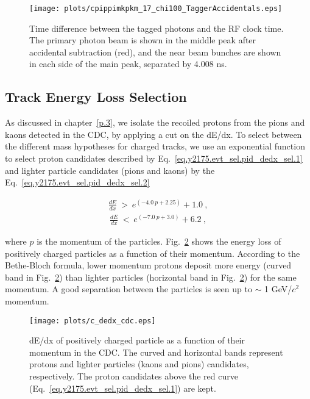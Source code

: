 \begin{figure}[H]
    \centering
        \texttt{[image: plots/cpippimkpkm\_17\_chi100\_TaggerAccidentals.eps]}
        \caption{Time difference between the tagged photons and the RF clock time. The primary photon beam is shown in the middle peak after accidental subtraction (red), and the near beam bunches are shown in each side of the main peak, separated by 4.008 ns.}
        \label{fig.chap.y2175.evt_sel.bea_pho_acc_sub}
\end{figure}

\subsection{Track Energy Loss Selection}
\label{chap.y2175.evt_sel.pid_dedx_sel}

As discussed in chapter~\ref{p.3}, we isolate the recoiled protons from the pions and kaons detected in the CDC, by applying a cut on the dE/dx. To select between the different mass hypotheses for charged tracks, we use an exponential function to select proton candidates described by Eq.~\ref{eq.y2175.evt_sel.pid_dedx_sel.1} and lighter particle candidates (pions and kaons) by the Eq.~\ref{eq.y2175.evt_sel.pid_dedx_sel.2}

\begin{equation}
    \begin{aligned}
        \label{eq.y2175.evt_sel.pid_dedx_sel.1}
        \frac{dE}{dx}~>~e^{(-4.0~p + 2.25)} + 1.0~,
    \end{aligned}
\end{equation}
\begin{equation}
    \begin{aligned}
        \label{eq.y2175.evt_sel.pid_dedx_sel.2}
        \frac{dE}{dx}~<~e^{(-7.0~p + 3.0)} + 6.2~,
    \end{aligned}
\end{equation}

where $p$ is the momentum of the particles.
Fig.~\ref{fig.y2175.evt_sel.pid_dedx_sel} shows the energy loss of positively charged particles as a function of their momentum. According to the Bethe-Bloch formula, lower momentum protons deposit more energy (curved band in Fig.~\ref{fig.y2175.evt_sel.pid_dedx_sel}) than lighter particles (horizontal band in Fig.~\ref{fig.y2175.evt_sel.pid_dedx_sel}) for the same momentum. A good separation between the particles is seen up to $\sim$ 1 GeV/$c^{2}$ momentum.

\begin{figure}[H]
    \centering
        \texttt{[image: plots/c\_dedx\_cdc.eps]}
        \caption{dE/dx of positively charged particle as a function of their momentum in the CDC. The curved and horizontal bands represent protons and lighter particles (kaons and pions) candidates, respectively. The proton candidates above the red curve (Eq.~\ref{eq.y2175.evt_sel.pid_dedx_sel.1}) are kept.}
        \label{fig.y2175.evt_sel.pid_dedx_sel}
\end{figure}

